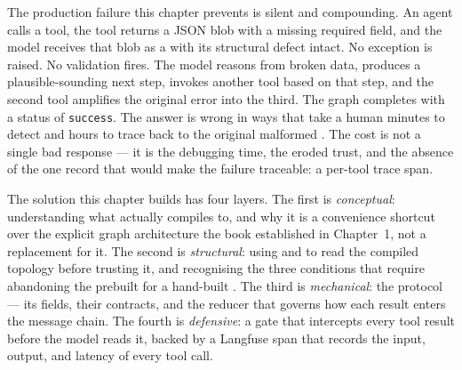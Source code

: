 

The production failure this chapter prevents is silent and compounding. An
agent calls a tool, the tool returns a JSON blob with a missing required
field, and the model receives that blob as a  with its
structural defect intact. No exception is raised. No validation fires. The
model reasons from broken data, produces a plausible-sounding next step,
invokes another tool based on that step, and the second tool amplifies the
original error into the third. The graph completes with a status of
\texttt{success}. The answer is wrong in ways that take a human minutes to
detect and hours to trace back to the original malformed .
The cost is not a single bad response --- it is the debugging time, the
eroded trust, and the absence of the one record that would make the failure
traceable: a per-tool trace span.

The solution this chapter builds has four layers. The first is
\emph{conceptual}: understanding what  actually
compiles to, and why it is a convenience shortcut over the explicit graph
architecture the book established in Chapter~1, not a replacement for it.
The second is \emph{structural}: using  and
 to read the compiled topology before trusting it,
and recognising the three conditions that require abandoning the prebuilt
for a hand-built . The third is \emph{mechanical}: the
 protocol --- its fields, their contracts, and the
 reducer that governs how each result enters the message
chain. The fourth is \emph{defensive}: a  gate that
intercepts every tool result before the model reads it, backed by a
Langfuse span that records the input, output, and latency of every tool
call.

